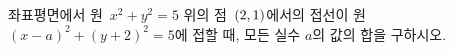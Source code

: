 좌표평면에서 원~$x^2+y^2=5$ 위의 점~$(2{,}\mkern3mu 1)$에서의 접선이 원~$(x-a)^2+(y+2)^2=5$에 접할 때, 모든 실수 $a$의 값의 합을 구하시오.
